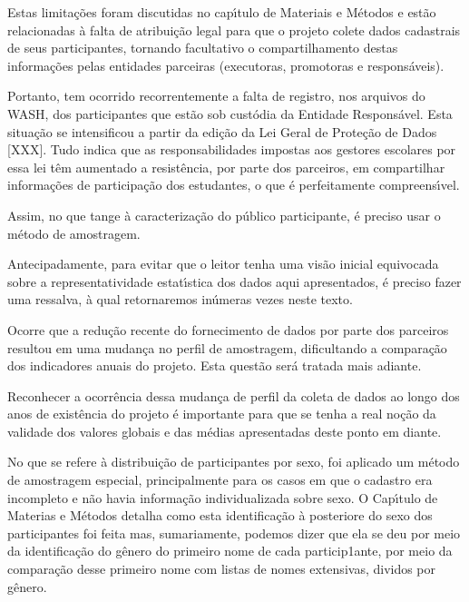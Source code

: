 \documentclass[
12pt,		%
openright,	%
twoside,  %
a4paper,			%
chapter=TITLE,		%
english,			%
french,				%
spanish,			%
brazil				%
]{USPSC-classe/USPSC}
\begin{document}
Estas limita\c{c}\~oes foram discutidas no cap\'{\i}tulo de Materiais e M\'etodos e est\~ao relacionadas \`a falta de atribui\c{c}\~ao legal para que o projeto colete dados cadastrais de seus participantes, tornando facultativo o compartilhamento destas informa\c{c}\~oes pelas entidades parceiras (executoras, promotoras e respons\'aveis).


Portanto, tem ocorrido recorrentemente a falta de registro, nos arquivos do WASH, dos participantes que est\~ao sob cust\'odia da Entidade Respons\'avel. Esta situa\c{c}\~ao se intensificou a partir da edi\c{c}\~ao da Lei Geral de Prote\c{c}\~ao de Dados [XXX]. Tudo indica que as responsabilidades impostas aos gestores escolares por essa lei t\^em aumentado a  resist\^encia, por parte dos parceiros, em compartilhar informa\c{c}\~oes de participa\c{c}\~ao dos estudantes, o que \'e perfeitamente compreens\'{\i}vel.


Assim, no que tange \`a caracteriza\c{c}\~ao do p\'ublico participante, \'e preciso usar o m\'etodo de amostragem.


Antecipadamente, para evitar que o leitor tenha uma vis\~ao inicial equivocada sobre a representatividade estat\'{\i}stica dos dados aqui apresentados, \'e preciso fazer uma ressalva, \`a qual retornaremos in\'umeras vezes neste texto.


Ocorre que a redu\c{c}\~ao recente do fornecimento de dados por parte dos parceiros resultou em uma mudan\c{c}a no perfil de amostragem, dificultando a compara\c{c}\~ao dos indicadores anuais do projeto. Esta quest\~ao ser\'a tratada mais adiante.


Reconhecer a ocorr\^encia dessa mudan\c{c}a de perfil da coleta de dados ao longo dos anos de exist\^encia do projeto \'e importante para que se tenha a real no\c{c}\~ao da validade dos valores globais e das m\'edias apresentadas deste ponto em diante.


No que se refere \`a distribui\c{c}\~ao de participantes por sexo, foi aplicado um m\'etodo de amostragem especial, principalmente para os casos em que o cadastro era incompleto e n\~ao havia informa\c{c}\~ao individualizada sobre sexo. O Cap\'{\i}tulo de Materias e M\'etodos detalha como esta identifica\c{c}\~ao \`a posteriore do sexo dos participantes foi feita mas, sumariamente, podemos dizer que ela se deu por meio da identifica\c{c}\~ao do g\^enero do primeiro nome de cada particip1ante, por meio da compara\c{c}\~ao desse primeiro nome com listas de nomes extensivas, dividos por g\^enero.
\end{document}

